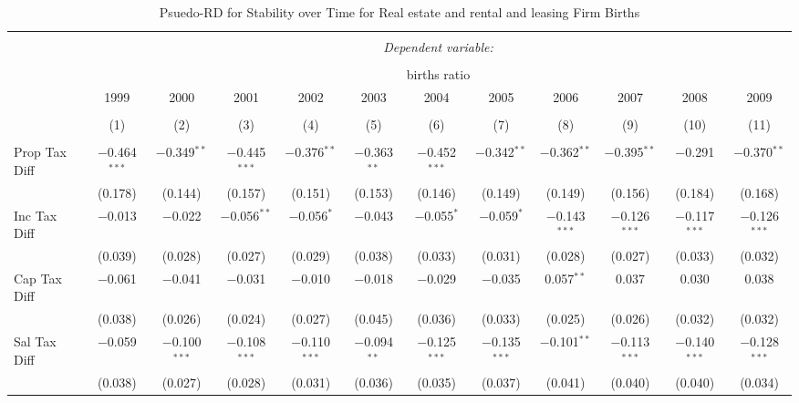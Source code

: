 
\begin{table}[!htbp] \centering 
  \caption{Psuedo-RD for Stability over Time for  Real estate and rental and leasing Firm Births} 
  \label{53year} 
\small 
\begin{tabular}{@{\extracolsep{5pt}}lccccccccccc} 
\\[-1.8ex]\hline 
\hline \\[-1.8ex] 
 & \multicolumn{11}{c}{\textit{Dependent variable:}} \\ 
\cline{2-12} 
\\[-1.8ex] & \multicolumn{11}{c}{births ratio} \\ 
 & 1999 & 2000 & 2001 & 2002 & 2003 & 2004 & 2005 & 2006 & 2007 & 2008 & 2009 \\ 
\\[-1.8ex] & (1) & (2) & (3) & (4) & (5) & (6) & (7) & (8) & (9) & (10) & (11)\\ 
\hline \\[-1.8ex] 
 Prop Tax Diff & $-$0.464$^{***}$ & $-$0.349$^{**}$ & $-$0.445$^{***}$ & $-$0.376$^{**}$ & $-$0.363$^{**}$ & $-$0.452$^{***}$ & $-$0.342$^{**}$ & $-$0.362$^{**}$ & $-$0.395$^{**}$ & $-$0.291 & $-$0.370$^{**}$ \\ 
  & (0.178) & (0.144) & (0.157) & (0.151) & (0.153) & (0.146) & (0.149) & (0.149) & (0.156) & (0.184) & (0.168) \\ 
  Inc Tax Diff & $-$0.013 & $-$0.022 & $-$0.056$^{**}$ & $-$0.056$^{*}$ & $-$0.043 & $-$0.055$^{*}$ & $-$0.059$^{*}$ & $-$0.143$^{***}$ & $-$0.126$^{***}$ & $-$0.117$^{***}$ & $-$0.126$^{***}$ \\ 
  & (0.039) & (0.028) & (0.027) & (0.029) & (0.038) & (0.033) & (0.031) & (0.028) & (0.027) & (0.033) & (0.032) \\ 
  Cap Tax Diff & $-$0.061 & $-$0.041 & $-$0.031 & $-$0.010 & $-$0.018 & $-$0.029 & $-$0.035 & 0.057$^{**}$ & 0.037 & 0.030 & 0.038 \\ 
  & (0.038) & (0.026) & (0.024) & (0.027) & (0.045) & (0.036) & (0.033) & (0.025) & (0.026) & (0.032) & (0.032) \\ 
  Sal Tax Diff & $-$0.059 & $-$0.100$^{***}$ & $-$0.108$^{***}$ & $-$0.110$^{***}$ & $-$0.094$^{**}$ & $-$0.125$^{***}$ & $-$0.135$^{***}$ & $-$0.101$^{**}$ & $-$0.113$^{***}$ & $-$0.140$^{***}$ & $-$0.128$^{***}$ \\ 
  & (0.038) & (0.027) & (0.028) & (0.031) & (0.036) & (0.035) & (0.037) & (0.041) & (0.040) & (0.040) & (0.034) \\ 

\end{tabular}
\end{table}
